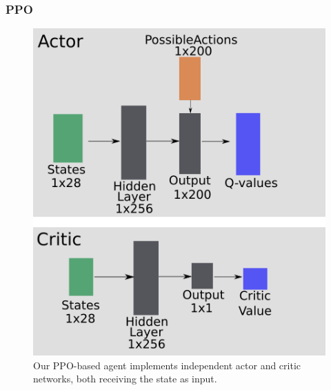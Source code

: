 \documentclass[a4paper,conference]{IEEEtran}
\begin{document}




\subsubsection{PPO}


\begin{figure}
    \centering
    \includegraphics[width=0.7\columnwidth]{PPONetwork.png}
    \caption{Our PPO-based agent implements independent actor and critic networks, both receiving the state as input.}
    \label{fig:ppoNetwork}
\end{figure}
\end{document}
